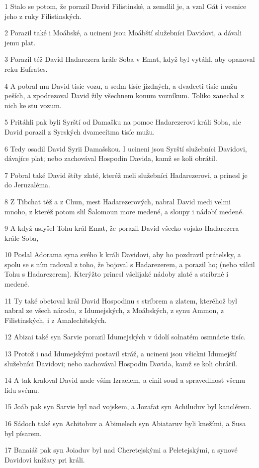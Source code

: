 \par 1 Stalo se potom, že porazil David Filistinské, a zemdlil je, a vzal Gát i vesnice jeho z ruky Filistinských.
\par 2 Porazil také i Moábské, a ucineni jsou Moábští služebníci Davidovi, a dávali jemu plat.
\par 3 Porazil též David Hadarezera krále Soba v Emat, když byl vytáhl, aby opanoval reku Eufrates.
\par 4 A pobral mu David tisíc vozu, a sedm tisíc jízdných, a dvadceti tisíc mužu peších, a zpodrezoval David žily všechnem konum vozníkum. Toliko zanechal z nich ke stu vozum.
\par 5 Pritáhli pak byli Syrští od Damašku na pomoc Hadarezerovi králi Soba, ale David porazil z Syrských dvamecítma tisíc mužu.
\par 6 Tedy osadil David Syrii Damašskou. I ucineni jsou Syrští služebníci Davidovi, dávajíce plat; nebo zachovával Hospodin Davida, kamž se koli obrátil.
\par 7 Pobral také David štíty zlaté, kteréž meli služebníci Hadarezerovi, a prinesl je do Jeruzaléma.
\par 8 Z Tibchat též a z Chun, mest Hadarezerových, nabral David medi velmi mnoho, z kteréž potom slil Šalomoun more medené, a sloupy i nádobí medené.
\par 9 A když uslyšel Tohu král Emat, že porazil David všecko vojsko Hadarezera krále Soba,
\par 10 Poslal Adorama syna svého k králi Davidovi, aby ho pozdravil prátelsky, a spolu se s ním radoval z toho, že bojoval s Hadarezerem, a porazil ho; (nebo válcil Tohu s Hadarezerem). Kterýžto prinesl všelijaké nádoby zlaté a stríbrné i medené.
\par 11 Ty také obetoval král David Hospodinu s stríbrem a zlatem, kteréhož byl nabral ze všech národu, z Idumejských, z Moábských, z synu Ammon, z Filistinských, i z Amalechitských.
\par 12 Abizai také syn Sarvie porazil Idumejských v údolí solnatém osmnácte tisíc.
\par 13 Protož i nad Idumejskými postavil stráž, a ucineni jsou všickni Idumejští služebníci Davidovi; nebo zachovával Hospodin Davida, kamž se koli obrátil.
\par 14 A tak kraloval David nade vším Izraelem, a cinil soud a spravedlnost všemu lidu svému.
\par 15 Joáb pak syn Sarvie byl nad vojskem, a Jozafat syn Achiluduv byl kanclérem.
\par 16 Sádoch také syn Achitobuv a Abimelech syn Abiataruv byli knežími, a Susa byl písarem.
\par 17 Banaiáš pak syn Joiaduv byl nad Cheretejskými a Peletejskými, a synové Davidovi knížaty pri králi.

